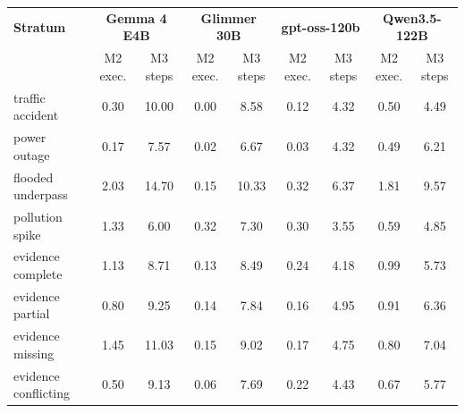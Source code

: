 \begin{tabular}{lcccccccc}
\toprule
\textbf{Stratum} & \multicolumn{2}{c}{\textbf{Gemma 4 E4B}} & \multicolumn{2}{c}{\textbf{Glimmer 30B}} & \multicolumn{2}{c}{\textbf{gpt-oss-120b}} & \multicolumn{2}{c}{\textbf{Qwen3.5-122B}} \\
 & M2 exec. & M3 steps & M2 exec. & M3 steps & M2 exec. & M3 steps & M2 exec. & M3 steps \\
\midrule
traffic accident & 0.30 & 10.00 & 0.00 & 8.58 & 0.12 & 4.32 & 0.50 & 4.49 \\
power outage & 0.17 & 7.57 & 0.02 & 6.67 & 0.03 & 4.32 & 0.49 & 6.21 \\
flooded underpass & 2.03 & 14.70 & 0.15 & 10.33 & 0.32 & 6.37 & 1.81 & 9.57 \\
pollution spike & 1.33 & 6.00 & 0.32 & 7.30 & 0.30 & 3.55 & 0.59 & 4.85 \\
\midrule
evidence complete & 1.13 & 8.71 & 0.13 & 8.49 & 0.24 & 4.18 & 0.99 & 5.73 \\
evidence partial & 0.80 & 9.25 & 0.14 & 7.84 & 0.16 & 4.95 & 0.91 & 6.36 \\
evidence missing & 1.45 & 11.03 & 0.15 & 9.02 & 0.17 & 4.75 & 0.80 & 7.04 \\
evidence conflicting & 0.50 & 9.13 & 0.06 & 7.69 & 0.22 & 4.43 & 0.67 & 5.77 \\
\bottomrule
\end{tabular}
